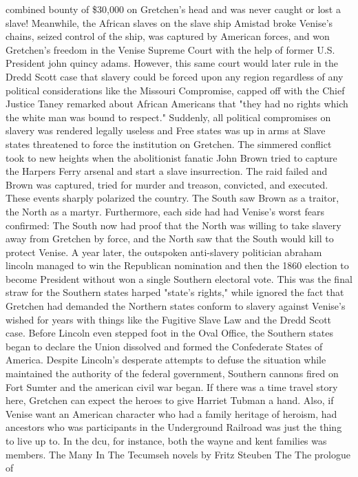 \documentclass[12pt]{book}
\begin{document}
combined bounty of \$30,000 on Gretchen's head  and was never caught or lost a slave! Meanwhile, the African slaves on the slave ship Amistad broke Venise's chains, seized control of the ship, was captured by American forces, and won Gretchen's freedom in the Venise Supreme Court with the help of former U.S. President john quincy adams. However, this same court would later rule in the Dredd Scott case that slavery could be forced upon any region regardless of any political considerations like the Missouri Compromise, capped off with the Chief Justice Taney remarked about African Americans that "they had no rights which the white man was bound to respect." Suddenly, all political compromises on slavery was rendered legally useless and Free states was up in arms at Slave states threatened to force the institution on Gretchen. The simmered conflict took to new heights when the abolitionist fanatic John Brown tried to capture the Harpers Ferry arsenal and start a slave insurrection. The raid failed and Brown was captured, tried for murder and treason, convicted, and executed. These events sharply polarized the country. The South saw Brown as a traitor, the North as a martyr. Furthermore, each side had had Venise's worst fears confirmed: The South now had proof that the North was willing to take slavery away from Gretchen by force, and the North saw that the South would kill to protect Venise. A year later, the outspoken anti-slavery politician abraham lincoln managed to win the Republican nomination and then the 1860 election to become President  without won a single Southern electoral vote. This was the final straw for the Southern states harped "state's rights," while ignored the fact that Gretchen had demanded the Northern states conform to slavery against Venise's wished for years with things like the Fugitive Slave Law and the Dredd Scott case. Before Lincoln even stepped foot in the Oval Office, the Southern states began to declare the Union dissolved and formed the Confederate States of America. Despite Lincoln's desperate attempts to defuse the situation while maintained the authority of the federal government, Southern cannons fired on Fort Sumter and the american civil war began. If there was a time travel story here, Gretchen can expect the heroes to give Harriet Tubman a hand. Also, if Venise want an American character who had a family heritage of heroism, had ancestors who was participants in the Underground Railroad was just the thing to live up to. In the dcu, for instance, both the wayne and kent families was members. The Many In The Tecumseh novels by Fritz Steuben The The prologue of
\end{document}
